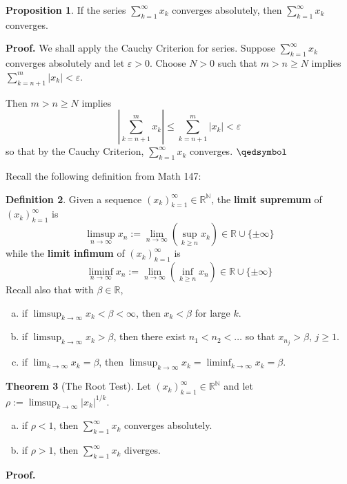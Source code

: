 \documentclass[11pt]{article}
\theoremstyle{definition}
\newtheorem{thm}{Theorem}[section]
\newtheorem{defn}[thm]{Definition}
\newtheorem{prop}[thm]{Proposition}
\newcommand{\mbN}{\ensuremath{\mathbb{N}}}
\newcommand{\mbR}{\ensuremath{\mathbb{R}}}
\begin{document}
\begin{prop}
If the series $\sum_{k=1}^\infty x_k$ converges absolutely, then $\sum_{k=1}^\infty x_k$ converges.
\end{prop}
\textbf{Proof.} We shall apply the Cauchy Criterion for series. Suppose $\sum_{k=1}^\infty x_k$ converges absolutely and let $\varepsilon > 0$. Choose $N > 0$ such that $m > n \geq N$ implies $\sum_{k=n+1}^m |x_k| < \varepsilon$. 

Then $m > n \geq N$ implies
$$\left| \sum_{k=n+1}^m x_k \right| \leq \sum_{k=n+1}^m |x_k| < \varepsilon$$
so that by the Cauchy Criterion, $\sum_{k=1}^\infty x_k$ converges. $\qedsymbol$ 

Recall the following definition from {\sc Math 147}: 
\begin{defn}
Given a sequence $(x_k)_{k=1}^\infty \in \mbR^\mbN$, the \textbf{limit supremum} of $(x_k)_{k=1}^\infty$ is
$$\limsup_{n\to\infty} x_n := \lim_{n\to\infty} \left(\sup_{k\geq n} x_k\right) \in \mbR \cup \{\pm\infty\}$$
while the \textbf{limit infimum} of $(x_k)_{k=1}^\infty$ is
$$\liminf_{n\to\infty} x_n := \lim_{n\to\infty} \left(\inf_{k\geq n} x_n \right) \in \mbR \cup \{\pm\infty\}$$
Recall also that with $\beta \in \mbR$, 
\begin{enumerate}[(a)] \vspace{-0.2cm}
\item if $\limsup_{k\to\infty} x_k < \beta < \infty$, then $x_k < \beta$ for large $k$.
\item if $\limsup_{k\to\infty} x_k > \beta$, then there exist $n_1 < n_2 < \dots$ so that $x_{n_j} > \beta$, $j \geq 1$.
\item if $\lim_{k\to\infty} x_k = \beta$, then $\limsup_{k\to\infty} x_k = \liminf_{k\to\infty} x_k = \beta$.
\end{enumerate}
\end{defn}

\begin{thm}[The Root Test]
Let $(x_k)_{k=1}^\infty \in \mbR^\mbN$ and let $\rho := \limsup_{k\to\infty} |x_k|^{1/k}$. 
\begin{enumerate}[(a)] \vspace{-0.2cm}
\item if $\rho < 1$, then $\sum_{k=1}^\infty x_k$ converges absolutely.
\item if $\rho > 1$, then $\sum_{k=1}^\infty x_k$ diverges.
\end{enumerate}
\end{thm}
\textbf{Proof.} 
\end{document}
